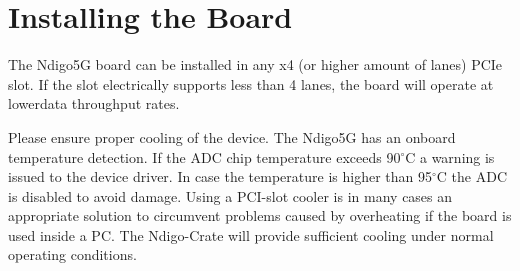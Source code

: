 \section{Installing the Board}
The Ndigo5G board can be installed in any x4 (or higher amount of lanes) PCIe slot. If the slot electrically supports less than 4 lanes, the board will operate at lowerdata throughput rates.\par
Please ensure proper cooling of the device. The Ndigo5G has an onboard temperature detection. If the ADC chip temperature exceeds 90$^{\circ}$C a warning is issued to the device driver. In case the temperature is higher than 95$^{\circ}$C the ADC is disabled to avoid damage. Using a PCI-slot cooler is in many cases an appropriate solution to circumvent problems caused by overheating if the board is used inside a PC. The Ndigo-Crate will provide sufficient cooling under normal operating conditions.\par
  
